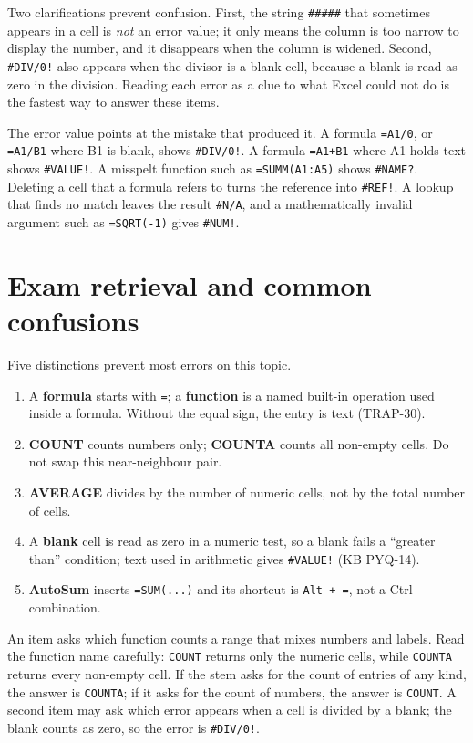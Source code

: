 Two clarifications prevent confusion. First, the string \texttt{\#\#\#\#\#}
that sometimes appears in a cell is \emph{not} an error value; it only means
the column is too narrow to display the number, and it disappears when the
column is widened. Second, \texttt{\#DIV/0!} also appears when the divisor is
a blank cell, because a blank is read as zero in the division. Reading each
error as a clue to what Excel could not do is the fastest way to answer these
items.

\begin{example}
The error value points at the mistake that produced it. A formula
\texttt{=A1/0}, or \texttt{=A1/B1} where B1 is blank, shows
\texttt{\#DIV/0!}. A formula \texttt{=A1+B1} where A1 holds text shows
\texttt{\#VALUE!}. A misspelt function such as \texttt{=SUMM(A1:A5)} shows
\texttt{\#NAME?}. Deleting a cell that a formula refers to turns the reference
into \texttt{\#REF!}. A lookup that finds no match leaves the result
\texttt{\#N/A}, and a mathematically invalid argument such as
\texttt{=SQRT(-1)} gives \texttt{\#NUM!}.
\end{example}

\section{Exam retrieval and common confusions}
Five distinctions prevent most errors on this topic.
\begin{enumerate}
  \item A \textbf{formula} starts with \texttt{=}; a \textbf{function} is a
    named built-in operation used inside a formula. Without the equal sign,
    the entry is text (TRAP-30).
  \item \textbf{COUNT} counts numbers only; \textbf{COUNTA} counts all
    non-empty cells. Do not swap this near-neighbour pair.
  \item \textbf{AVERAGE} divides by the number of numeric cells, not by the
    total number of cells.
  \item A \textbf{blank} cell is read as zero in a numeric test, so a blank
    fails a ``greater than'' condition; text used in arithmetic gives
    \texttt{\#VALUE!} (KB PYQ-14).
  \item \textbf{AutoSum} inserts \texttt{=SUM(...)} and its shortcut is
    \texttt{Alt + =}, not a Ctrl combination.
\end{enumerate}

\begin{example}
An item asks which function counts a range that mixes numbers and labels.
Read the function name carefully: \texttt{COUNT} returns only the numeric
cells, while \texttt{COUNTA} returns every non-empty cell. If the stem asks
for the count of entries of any kind, the answer is \texttt{COUNTA}; if it
asks for the count of numbers, the answer is \texttt{COUNT}. A second item
may ask which error appears when a cell is divided by a blank; the blank
counts as zero, so the error is \texttt{\#DIV/0!}.
\end{example}

